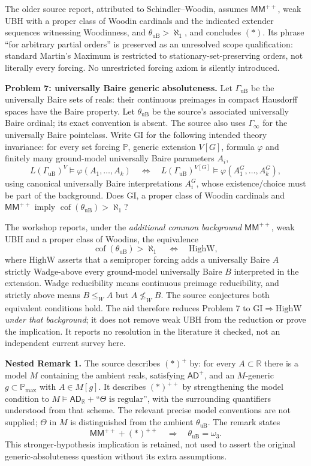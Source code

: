 \documentclass[11pt]{article}
\newcommand{\R}{\mathbb{R}}
\begin{document}
The older source report, attributed to Schindler--Woodin, assumes $\mathsf{MM}^{++}$, weak UBH with a proper class of Woodin cardinals and the indicated extender sequences witnessing Woodinness, and $\theta_{\mathrm{uB}}>\aleph_1$, and concludes $(*)$. Its phrase ``for arbitrary partial orders'' is preserved as an unresolved scope qualification: standard Martin's Maximum is restricted to stationary-set-preserving orders, not literally every forcing. No unrestricted forcing axiom is silently introduced.

\textbf{Problem 7: universally Baire generic absoluteness.} Let $\Gamma_{\mathrm{uB}}$ be the universally Baire sets of reals: their continuous preimages in compact Hausdorff spaces have the Baire property. Let $\theta_{\mathrm{uB}}$ be the source's associated universally Baire ordinal; its exact convention is absent. The source also uses $\Gamma_\infty$ for the universally Baire pointclass. Write $\mathrm{GI}$ for the following intended theory invariance: for every set forcing $\mathbb P$, generic extension $V[G]$, formula $\varphi$ and finitely many ground-model universally Baire parameters $A_i$,
\[
 L(\Gamma_{\mathrm{uB}})^V\models\varphi(A_1,\ldots,A_k)
 \quad\Longleftrightarrow\quad
 L(\Gamma_{\mathrm{uB}})^{V[G]}
             \models\varphi(A_1^G,\ldots,A_k^G),
\]
using canonical universally Baire interpretations $A_i^G$, whose existence/choice must be part of the background. Does $\mathrm{GI}$, a proper class of Woodin cardinals and $\mathsf{MM}^{++}$ imply $\operatorname{cof}(\theta_{\mathrm{uB}})>\aleph_1$?

The workshop reports, under the \emph{additional common background} $\mathsf{MM}^{++}$, weak UBH and a proper class of Woodins, the equivalence
\[
 \operatorname{cof}(\theta_{\mathrm{uB}})>\aleph_1
 \quad\Longleftrightarrow\quad \mathrm{HighW},
\]
where $\mathrm{HighW}$ asserts that a semiproper forcing adds a universally Baire $A$ strictly Wadge-above every ground-model universally Baire $B$ interpreted in the extension. Wadge reducibility means continuous preimage reducibility, and strictly above means $B\le_WA$ but $A\not\le_WB$. The source conjectures both equivalent conditions hold. The aid therefore reduces Problem 7 to $\mathrm{GI}\Rightarrow\mathrm{HighW}$ \emph{under that background}; it does not remove weak UBH from the reduction or prove the implication. It reports no resolution in the literature it checked, not an independent current survey here.

\textbf{Nested Remark 1.} The source describes $(*)^+$ by: for every $A\subset\R$ there is a model $M$ containing the ambient reals, satisfying $\mathsf{AD}^+$, and an $M$-generic $g\subset\mathbb P_{\max}$ with $A\in M[g]$. It describes $(*)^{++}$ by strengthening the model condition to $M\models\mathsf{AD}_{\R}+\text{``}\Theta\text{ is regular''}$, with the surrounding quantifiers understood from that scheme. The relevant precise model conventions are not supplied; $\Theta$ in $M$ is distinguished from the ambient $\theta_{\mathrm{uB}}$. The remark states
\[
 \mathsf{MM}^{++}+(*)^{++}\quad\Longrightarrow\quad
 \theta_{\mathrm{uB}}=\omega_3.
\]
This stronger-hypothesis implication is retained, not used to assert the original generic-absoluteness question without its extra assumptions.
\end{document}
